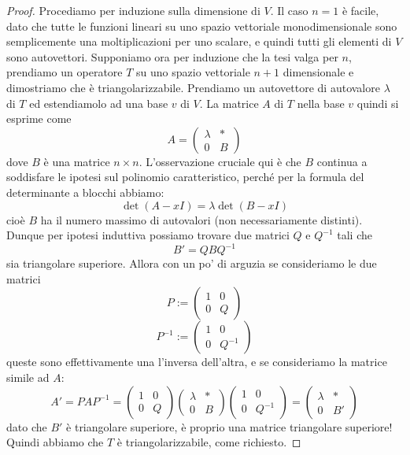 \documentclass[11pt]{scrartcl}
\begin{document}
   	 \begin{proof}
   	 	Procediamo per induzione sulla dimensione di $V$. Il caso $n=1$ è facile, dato che tutte le funzioni lineari su uno spazio vettoriale monodimensionale sono semplicemente una moltiplicazioni per uno scalare, e quindi tutti gli elementi di $V$ sono autovettori. Supponiamo ora per induzione che la tesi valga per $n$, prendiamo un operatore $T$ su uno spazio vettoriale $n+1$ dimensionale e dimostriamo che è triangolarizzabile. Prendiamo un autovettore di autovalore $\lambda$ di $T$ ed estendiamolo ad una base $v$ di $V$. La matrice $A$ di $T$ nella base $v$ quindi si esprime come
   	 	$$
   	 	A=
   	 	\left(
   	 	\begin{array}{c|c}
   	 		\lambda & * \\
   	 		\hline
   	 		0 & B
   	 	\end{array}
   	 	\right)
   	 	$$
   	 	dove $B$ è una matrice $n\times n$. L'osservazione cruciale qui è che $B$ continua a soddisfare le ipotesi sul polinomio caratteristico, perché per la formula del determinante a blocchi abbiamo:
   	 	$$\det\left(A-xI\right)=\lambda \det\left(B-xI\right)$$
   	 	cioè $B$ ha il numero massimo di autovalori (non necessariamente distinti). Dunque per ipotesi induttiva possiamo trovare due matrici $Q$ e $Q^{-1}$ tali che 
   	 	$$B'=QBQ^{-1}$$
   	 	sia triangolare superiore. Allora con un po' di arguzia se consideriamo le due matrici
   	 	$$P:=
   	 	\left(
   	 	\begin{array}{c|c}
   	 		1 & 0 \\
   	 		\hline
   	 		0 & Q
   	 	\end{array}
   	 	\right)
   	 	$$
   	 	$$P^{-1}:=
   	 	\left(
   	 	\begin{array}{c|c}
   	 		1 & 0 \\
   	 		\hline
   	 		0 & Q^{-1}
   	 	\end{array}
   	 	\right)
   	 	$$
   	 	queste sono effettivamente una l'inversa dell'altra, e se consideriamo la matrice simile ad $A$:
   	 	$$A'=PAP^{-1}=
   	 	\left(
   	 	\begin{array}{c|c}
   	 		1 & 0 \\
   	 		\hline
   	 		0 & Q
   	 	\end{array}
   	 	\right)
   	 	\left(
   	 	\begin{array}{c|c}
   	 		\lambda & * \\
   	 		\hline
   	 		0 & B
   	 	\end{array}
   	 	\right)
   	 	\left(
   	 	\begin{array}{c|c}
   	 		1 & 0 \\
   	 		\hline
   	 		0 & Q^{-1}
   	 	\end{array}
   	 	\right)=
   	 	\left(
   	 	\begin{array}{c|c}
   	 		\lambda & * \\
   	 		\hline
   	 		0 & B'
   	 	\end{array}
   	 	\right)
   	 	$$
   	 	dato che $B'$ è triangolare superiore, è proprio una matrice triangolare superiore! Quindi abbiamo che $T$ è triangolarizzabile, come richiesto.
   	 \end{proof}
   	 
\end{document}
